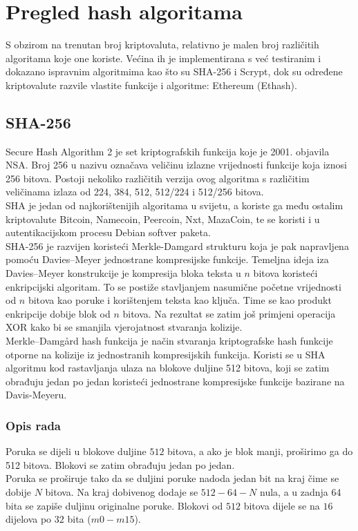 \documentclass[12pt]{article}
\begin{document}
\pagebreak
\section{Pregled hash algoritama}
S obzirom na trenutan broj kriptovaluta, relativno je malen broj različitih algoritama koje one koriste. Većina ih je implementirana s već testiranim i dokazano ispravnim algoritmima kao što su SHA-256 i Scrypt, dok su određene kriptovalute razvile vlastite funkcije i algoritme: Ethereum (Ethash).


\subsection{SHA-256}
Secure Hash Algorithm 2 je set kriptografskih funkcija koje je 2001. objavila NSA. Broj 256 u nazivu označava veličinu izlazne vrijednosti funkcije koja iznosi 256 bitova. Postoji nekoliko različitih verzija ovog algoritma s različitim veličinama izlaza od 224, 384, 512, 512/224 i 512/256 bitova. \\
SHA je jedan od najkorištenijih algoritama u svijetu, a koriste ga među ostalim kriptovalute Bitcoin, Namecoin, Peercoin, Nxt, MazaCoin, te se koristi i u autentikacijskom procesu Debian softver paketa. \\

SHA-256 je razvijen koristeći Merkle-Damgard strukturu koja je pak napravljena pomoću Davies–Meyer jednostrane kompresijske funkcije. Temeljna ideja iza Davies–Meyer konstrukcije je kompresija bloka teksta u $n$ bitova koristeći enkripcijski algoritam. To se postiže stavljanjem nasumične početne vrijednosti od $n$ bitova kao poruke i korištenjem teksta kao ključa. Time se kao produkt enkripcije dobije blok od $n$ bitova. Na rezultat se zatim još primjeni operacija XOR kako bi se smanjila vjerojatnost stvaranja kolizije. \\
Merkle–Damgård hash funkcija je način stvaranja kriptografske hash funkcije otporne na kolizije iz jednostranih kompresijskih funkcija. Koristi se u SHA algoritmu kod rastavljanja ulaza na blokove duljine 512 bitova, koji se zatim obrađuju jedan po jedan koristeći jednostrane kompresijske funkcije bazirane na Davis-Meyeru.

\subsubsection{Opis rada}
Poruka se dijeli u blokove duljine $512$ bitova, a ako je blok manji, proširimo ga do 512 bitova. Blokovi se zatim obrađuju jedan po jedan.\\
Poruka se proširuje tako da se duljini poruke  nadoda jedan bit na kraj čime se dobije $N$ bitova. Na kraj dobivenog dodaje se $512 - 64 - N$ nula, a u zadnja 64 bita se zapiše duljinu originalne poruke.
Blokovi od $512$ bitova dijele se na $16$ dijelova po $32$ bita ($m0 - m15$).\\
\end{document}
